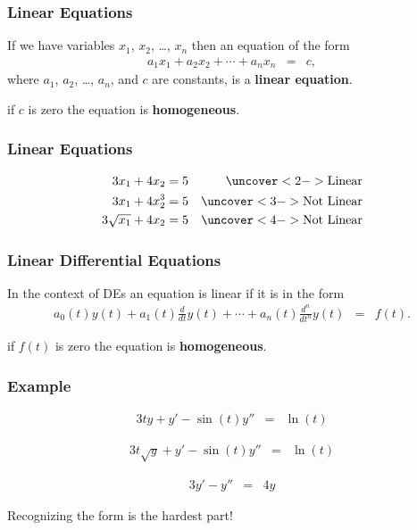 \begin{frame}
  \frametitle{Linear Equations}

  If we have variables $x_1$, $x_2$, \ldots, $x_n$ then an equation of
  the form
  \begin{eqnarray*}
    a_1 x_1 + a_2 x_2 + \cdots + a_n x_n & = & c,
  \end{eqnarray*}
  where $a_1$, $a_2$, \ldots, $a_n$, and $c$ are constants, is a
  \textbf{linear equation}.

  if $c$ is zero the equation is \textbf{homogeneous}.

\end{frame}


\begin{frame}
  \frametitle{Linear Equations}

  \begin{eqnarray*}
    3 x_1 + 4 x_2 = 5 & & \uncover<2->{\mathrm{Linear}} \\
    3 x_1 + 4 x^3_2 = 5 & & \uncover<3->{\mathrm{Not~Linear}} \\
    3 \sqrt{x_1} + 4 x_2 = 5 & & \uncover<4->{\mathrm{Not~Linear}} \\
  \end{eqnarray*}


\end{frame}


\begin{frame}
  \frametitle{Linear Differential Equations}

  In the context of DEs an equation is linear if it is in the form
  \begin{eqnarray*}
    a_0(t) y(t) + a_1(t) \frac{d}{dt}y(t) + \cdots +
    a_n(t) \frac{d^n}{dt^n}y(t) & = & f(t).
  \end{eqnarray*}

  if $f(t)$ is zero the equation is \textbf{homogeneous}.

\end{frame}


\begin{frame}
  \frametitle{Example}

  \vspace*{-3em}
  \begin{eqnarray*}
    3t y + y' - \sin(t) y'' & = & \ln(t)
  \end{eqnarray*}
  \centerline{}

  \begin{eqnarray*}
    3t \sqrt{y} + y' - \sin(t) y'' & = & \ln(t)
  \end{eqnarray*}
  \centerline{}

  \begin{eqnarray*}
    3 y' -y'' & = & 4 y
  \end{eqnarray*}
  \centerline{}
  \centerline{}

  Recognizing the form is the hardest part!

\end{frame}

